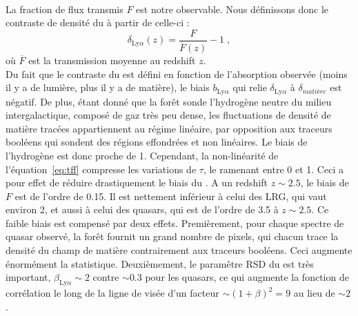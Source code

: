 \paragraph{}
La fraction de flux transmis $F$ est notre observable. Nous définissons donc le contraste de densité du \lya{} à partir de celle-ci : 
\begin{equation}
  \label{eq:delta_lya}
  \delta_{\mathrm{Ly}\alpha}(z) = \frac{F}{\overline F(z)} - 1  \; , 
\end{equation}
où $\overline F$ est la transmission moyenne au redshift $z$.\\
Du fait que le contraste du \lya{} est défini en fonction de l'absorption observée (moins il y a de lumière, plus il y a de matière), le biais $b_{\mathrm{Ly}\alpha}$ qui relie $\delta_{\mathrm{Ly}\alpha}$ à $\delta_{matière}$ est négatif.
De plus, étant donné que la forêt \lya{} sonde l'hydrogène neutre du milieu intergalactique, composé de gaz très peu dense, les fluctuations de densité de matière tracées appartiennent au régime linéaire, par opposition aux traceurs booléens qui sondent des régions effondrées et non linéaires. Le biais de l'hydrogène est donc proche de 1. Cependant, la non-linéarité de l'équation~\ref{eq:tff} compresse les variations de $\tau$, le ramenant entre 0 et 1. Ceci a pour effet de réduire drastiquement le biais du \lya{}. A un redshift $z \sim \num{2.5}$, le biais de $F$ est de l'ordre de \num{0.15}. Il est nettement inférieur à celui des LRG, qui vaut environ 2, et aussi à celui des quasars, qui est de l'ordre de \num{3.5} à $z \sim \num{2.5}$.
Ce faible biais est compensé par deux effets.
Premièrement, pour chaque spectre de quasar observé, la forêt \lya{} fournit un grand nombre de pixels, qui chacun trace la densité du champ de matière contrairement aux traceurs booléens. Ceci augmente énormément la statistique.
Deuxièmement, le paramêtre RSD du \lya{} est très important, $\beta_{\mathrm{Ly}\alpha} \sim 2$ contre $\sim \num{0.3}$ pour les quasars, ce qui augmente  la fonction de corrélation le long de la ligne de visée d'un facteur $\sim (1+\beta)^2 = 9$ au lieu de $\sim 2$.

